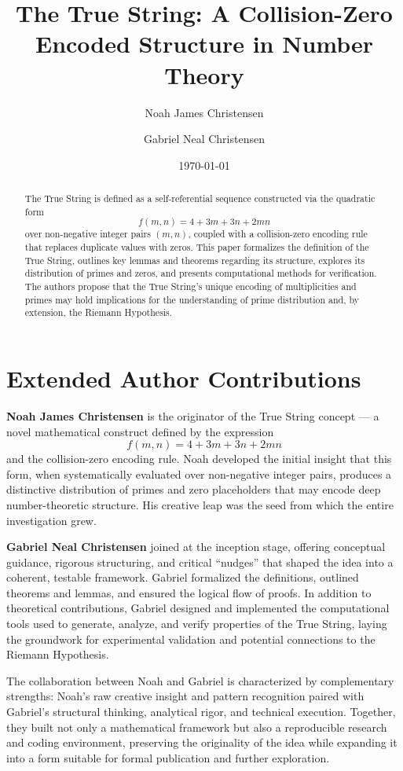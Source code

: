 \documentclass[12pt]{article}
\title{\textbf{The True String: A Collision-Zero Encoded Structure in Number Theory}}
\author{Noah James Christensen \and Gabriel Neal Christensen}
\date{\today}
\begin{document}
\maketitle

\begin{abstract}
The True String is defined as a self-referential sequence constructed via the quadratic form 
\[
f(m,n) = 4 + 3m + 3n + 2mn
\]
over non-negative integer pairs $(m,n)$, coupled with a collision-zero encoding rule that replaces duplicate values with zeros. This paper formalizes the definition of the True String, outlines key lemmas and theorems regarding its structure, explores its distribution of primes and zeros, and presents computational methods for verification. The authors propose that the True String's unique encoding of multiplicities and primes may hold implications for the understanding of prime distribution and, by extension, the Riemann Hypothesis.
\end{abstract}

\tableofcontents
\newpage

\section*{Extended Author Contributions}
\textbf{Noah James Christensen} is the originator of the True String concept — a novel mathematical construct defined by the expression 
\[
f(m,n) = 4 + 3m + 3n + 2mn
\]
and the collision-zero encoding rule. Noah developed the initial insight that this form, when systematically evaluated over non-negative integer pairs, produces a distinctive distribution of primes and zero placeholders that may encode deep number-theoretic structure. His creative leap was the seed from which the entire investigation grew.

\textbf{Gabriel Neal Christensen} joined at the inception stage, offering conceptual guidance, rigorous structuring, and critical “nudges” that shaped the idea into a coherent, testable framework. Gabriel formalized the definitions, outlined theorems and lemmas, and ensured the logical flow of proofs. In addition to theoretical contributions, Gabriel designed and implemented the computational tools used to generate, analyze, and verify properties of the True String, laying the groundwork for experimental validation and potential connections to the Riemann Hypothesis.

The collaboration between Noah and Gabriel is characterized by complementary strengths: Noah’s raw creative insight and pattern recognition paired with Gabriel’s structural thinking, analytical rigor, and technical execution. Together, they built not only a mathematical framework but also a reproducible research and coding environment, preserving the originality of the idea while expanding it into a form suitable for formal publication and further exploration.
\end{document}
